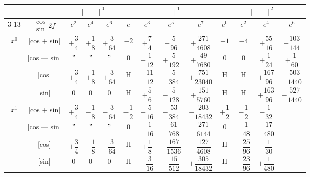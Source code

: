 \documentclass[11pt,a4paper]{book}
\begin{document}
\vspace{1em}


\begin{center}
\small
\begin{tabular}{|c|c|c|c|c|c|c|c|c|c|c|c|c|}
\hline
& & \multicolumn{3}{c|}{$[\phantom{()}]^0$} & \multicolumn{4}{c|}{$[\phantom{()}]^1$} & \multicolumn{4}{c|}{$[\phantom{()}]^2$} \\
\cline{3-13}
& $\begin{smallmatrix} \cos \\ \sin \end{smallmatrix} 2f$ & $e^2$ & $e^4$ & $e^6$ & $e$ & $e^3$ & $e^5$ & $e^7$ & $e^0$ & $e^2$ & $e^4$ & $e^6$ \\
\hline
\multirow{4}{*}{$x^0$} & [cos + sin] & $+\dfrac{3}{4}$ & $+\dfrac{1}{8}$ & $+\dfrac{3}{64}$ & $-2$ & $+\dfrac{7}{4}$ & $-\dfrac{5}{96}$ & $+\dfrac{271}{4608}$ & $+1$ & $-4$ & $+\dfrac{55}{16}$ & $-\dfrac{103}{144}$ \\
& [cos --- sin] & $"$ & $"$ & $"$ & $0$ & $+\dfrac{1}{12}$ & $+\dfrac{5}{192}$ & $+\dfrac{49}{7680}$ & $0$ & $0$ & $+\dfrac{1}{24}$ & $+\dfrac{1}{60}$ \\
& [cos] & $+\dfrac{3}{4}$ & $+\dfrac{1}{8}$ & $+\dfrac{3}{64}$ & H & $+\dfrac{11}{12}$ & $-\dfrac{5}{384}$ & $+\dfrac{751}{23040}$ & H & H & $+\dfrac{167}{96}$ & $-\dfrac{503}{1440}$ \\
& [sin] & $0$ & $0$ & $0$ & H & $+\dfrac{5}{6}$ & $-\dfrac{5}{128}$ & $+\dfrac{151}{5760}$ & H & H & $+\dfrac{163}{96}$ & $-\dfrac{527}{1440}$ \\
\hline
\multirow{4}{*}{$x^1$} & [cos + sin] & $+\dfrac{3}{4}$ & $-\dfrac{1}{8}$ & $-\dfrac{3}{64}$ & $-\dfrac{1}{2}$ & $+\dfrac{5}{16}$ & $-\dfrac{53}{384}$ & $-\dfrac{203}{18432}$ & $+\dfrac{1}{2}$ & $-\dfrac{1}{2}$ & $-\dfrac{1}{32}$ \\
& [cos --- sin] & $"$ & $"$ & $"$ & $0$ & $-\dfrac{1}{16}$ & $-\dfrac{61}{768}$ & $-\dfrac{271}{6144}$ & $0$ & $-\dfrac{1}{48}$ & $-\dfrac{17}{480}$ \\
& [cos] & $+\dfrac{3}{4}$ & $-\dfrac{1}{8}$ & $-\dfrac{3}{64}$ & H & $+\dfrac{1}{8}$ & $-\dfrac{167}{1536}$ & $-\dfrac{127}{4608}$ & H & $-\dfrac{25}{96}$ & $-\dfrac{1}{30}$ \\
& [sin] & $0$ & $0$ & $0$ & H & $+\dfrac{3}{16}$ & $-\dfrac{15}{512}$ & $+\dfrac{305}{18432}$ & H & $-\dfrac{23}{96}$ & $+\dfrac{1}{480}$ \\

\end{tabular}
\end{center}
\end{document}
